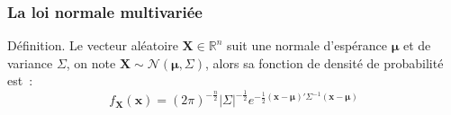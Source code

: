 \documentclass[10pt]{beamer}
\theoremstyle{plain}
\newenvironment{defn}[1]
{\bgroup \small\begin{block}{Définition. #1}}
  {\end{block}\egroup}
\begin{document}
\begin{frame}
  \frametitle{La loi normale multivariée}

  \begin{defn}{}
    Le vecteur aléatoire $\bm{X}\in \mathbb R^n$ suit une normale d'espérance $\bm \mu$ et de variance $\Sigma$, on note $\bm{X}\sim\mathcal N \left(\bm\mu, \Sigma\right)$, alors sa fonction de densité de probabilité est~:
    \[
      f_{\bm X}(\bm x) = \left( 2\pi \right)^{-\frac{n}{2}}\left| \Sigma \right|^{-\frac{1}{2}}e^{-\frac{1}{2}\left(\bm x-\bm\mu\right)'\Sigma^{-1}\left(\bm x-\bm\mu\right)}
    \]
  \end{defn}

\end{frame}
\end{document}

